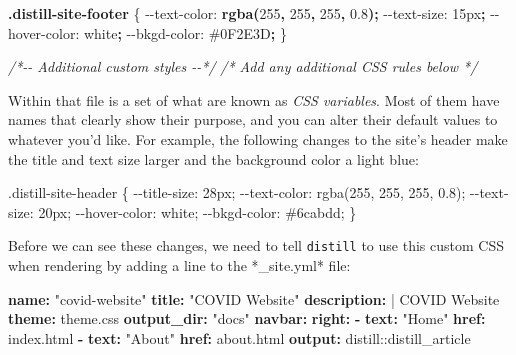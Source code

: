 \documentclass[
]{book}
\newenvironment{Shaded}{\begin{snugshade}}{\end{snugshade}}
\newcommand{\AttributeTok}[1]{\textcolor[rgb]{0.13,0.29,0.53}{#1}}
\newcommand{\CharTok}[1]{\textcolor[rgb]{0.31,0.60,0.02}{#1}}
\newcommand{\CommentTok}[1]{\textcolor[rgb]{0.56,0.35,0.01}{\textit{#1}}}
\newcommand{\ConstantTok}[1]{\textcolor[rgb]{0.56,0.35,0.01}{#1}}
\newcommand{\DataTypeTok}[1]{\textcolor[rgb]{0.13,0.29,0.53}{#1}}
\newcommand{\DecValTok}[1]{\textcolor[rgb]{0.00,0.00,0.81}{#1}}
\newcommand{\FunctionTok}[1]{\textcolor[rgb]{0.13,0.29,0.53}{\textbf{#1}}}
\newcommand{\KeywordTok}[1]{\textcolor[rgb]{0.13,0.29,0.53}{\textbf{#1}}}
\newcommand{\NormalTok}[1]{#1}
\newcommand{\OperatorTok}[1]{\textcolor[rgb]{0.81,0.36,0.00}{\textbf{#1}}}
\newcommand{\StringTok}[1]{\textcolor[rgb]{0.31,0.60,0.02}{#1}}
\newcommand{\VariableTok}[1]{\textcolor[rgb]{0.00,0.00,0.00}{#1}}
\begin{document}
\begin{Shaded}
\begin{Highlighting}[]
\FunctionTok{.distill{-}site{-}footer}\NormalTok{ \{}
  \VariableTok{{-}{-}text{-}color}\NormalTok{:       }\FunctionTok{rgba(}\DecValTok{255}\OperatorTok{,} \DecValTok{255}\OperatorTok{,} \DecValTok{255}\OperatorTok{,} \DecValTok{0.8}\FunctionTok{)}\OperatorTok{;}
  \VariableTok{{-}{-}text{-}size}\NormalTok{:        }\DecValTok{15}\DataTypeTok{px}\OperatorTok{;}
  \VariableTok{{-}{-}hover{-}color}\NormalTok{:      }\ConstantTok{white}\OperatorTok{;}
  \VariableTok{{-}{-}bkgd{-}color}\NormalTok{:       }\ConstantTok{\#0F2E3D}\OperatorTok{;}
\NormalTok{\}}

\CommentTok{/*{-}{-} Additional custom styles {-}{-}*/}
\CommentTok{/* Add any additional CSS rules below                      */}
\end{Highlighting}
\end{Shaded}

Within that file is a set of what are known as \emph{CSS variables}. Most of them have names that clearly show their purpose, and you can alter their default values to whatever you'd like. For example, the following changes to the site's header make the title and text size larger and the background color a light blue:

\begin{Shaded}
\begin{Highlighting}[]
\NormalTok{.distill{-}site{-}header \{}
\NormalTok{  {-}{-}title{-}size:       28px;}
\NormalTok{  {-}{-}text{-}color:       rgba(255, 255, 255, 0.8);}
\NormalTok{  {-}{-}text{-}size:        20px;}
\NormalTok{  {-}{-}hover{-}color:      white;}
\NormalTok{  {-}{-}bkgd{-}color:       \#6cabdd;}
\NormalTok{\}}
\end{Highlighting}
\end{Shaded}

Before we can see these changes, we need to tell \texttt{distill} to use this custom CSS when rendering by adding a line to the *\_site.yml* file:

\begin{Shaded}
\begin{Highlighting}[]
\FunctionTok{name}\KeywordTok{:}\AttributeTok{ }\StringTok{"covid{-}website"}
\FunctionTok{title}\KeywordTok{:}\AttributeTok{ }\StringTok{"COVID Website"}
\FunctionTok{description}\KeywordTok{: }\CharTok{|}
\NormalTok{  COVID Website}
\FunctionTok{theme}\KeywordTok{:}\AttributeTok{ theme.css}
\FunctionTok{output\_dir}\KeywordTok{:}\AttributeTok{ }\StringTok{"docs"}
\FunctionTok{navbar}\KeywordTok{:}
\AttributeTok{  }\FunctionTok{right}\KeywordTok{:}
\AttributeTok{    }\KeywordTok{{-}}\AttributeTok{ }\FunctionTok{text}\KeywordTok{:}\AttributeTok{ }\StringTok{"Home"}
\AttributeTok{      }\FunctionTok{href}\KeywordTok{:}\AttributeTok{ index.html}
\AttributeTok{    }\KeywordTok{{-}}\AttributeTok{ }\FunctionTok{text}\KeywordTok{:}\AttributeTok{ }\StringTok{"About"}
\AttributeTok{      }\FunctionTok{href}\KeywordTok{:}\AttributeTok{ about.html}
\FunctionTok{output}\KeywordTok{:}\AttributeTok{ distill::distill\_article}
\end{Highlighting}
\end{Shaded}
\end{document}
